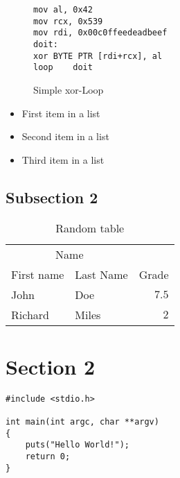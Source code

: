 \documentclass[DIV=calc, paper=a4, fontsize=11pt, twocolumn]{scrartcl}
\begin{document}
\lipsum[7] %

\begin{figure}
\begin{lstlisting}[language={[x86_64]Assembler}]
mov	al, 0x42
mov	rcx, 0x539
mov	rdi, 0x00c0ffeedeadbeef
doit:
xor	BYTE PTR [rdi+rcx], al
loop	doit
\end{lstlisting}
\caption{Simple xor-Loop}
\end{figure}

\lipsum[5] %

\begin{itemize}
\item First item in a list
\item Second item in a list
\item Third item in a list
\end{itemize}

\lipsum[6] %


\subsection*{Subsection 2}

\lipsum[7] %

\begin{table}
\caption{Random table}
\centering
\begin{tabular}{llr}
\toprule
\multicolumn{2}{c}{Name} \\
\cmidrule(r){1-2}
First name & Last Name & Grade \\
\midrule
John & Doe & $7.5$ \\
Richard & Miles & $2$ \\
\bottomrule
\end{tabular}
\end{table}


\section*{Section 2}

\lipsum[4]

\begin{lstlisting}
#include <stdio.h>

int main(int argc, char **argv)
{
	puts("Hello World!");
	return 0;
}
\end{lstlisting}
\end{document}
